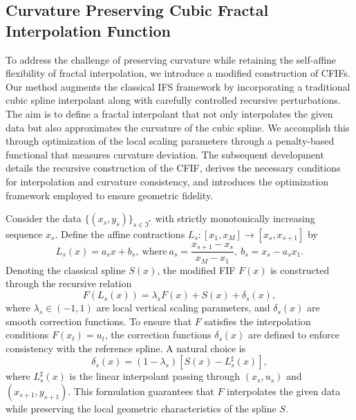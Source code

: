 \documentclass[runningheads]{llncs}
\begin{document}
	\subsection{Curvature Preserving Cubic Fractal Interpolation Function}
	To address the challenge of preserving curvature while retaining the self-affine flexibility of fractal interpolation, we introduce a modified construction of CFIFs. Our method augments the classical IFS framework by incorporating a traditional cubic spline interpolant along with carefully controlled recursive perturbations. The aim is to define a fractal interpolant that not only interpolates the given data but also approximates the curvature of the cubic spline. We accomplish this through optimization of the local scaling parameters through a penalty-based functional that measures curvature deviation. The subsequent development details the recursive construction of the CFIF, derives the necessary conditions for interpolation and curvature consistency, and introduces the optimization framework employed to ensure geometric fidelity.
	
	Consider the data $\{(x_s, y_s)\}_{s \in \Im^*} $ with strictly monotonically increasing sequence $x_s$. Define the affine contractions $ L_s : [x_1, x_M] \to [x_s, x_{s+1}] $ by $$ L_s(x) = a_s x + b_s, \ \text{where} \ a_s = \frac{x_{s+1} - x_s}{x_M - x_1}, \ b_s = x_s - a_s x_1.$$ Denoting the classical spline $ S(x) $, the modified FIF $ F(x) $ is constructed through the recursive relation
	\begin{equation}\label{NewF}
		F(L_s(x)) = \lambda_s F(x) + S(x) + \delta_s(x),
	\end{equation}
	where $ \lambda_s \in (-1,1) $ are local vertical scaling parameters, and $ \delta_s(x) $ are smooth correction functions. To ensure that $ F $ satisfies the interpolation conditions $ F(x_t) = u_t $, the correction functions $ \delta_s(x) $ are defined to enforce consistency with the reference spline. A natural choice is $$ \delta_s(x) = (1 - \lambda_s) \left[ S(x) - L_s^\sharp(x) \right],$$ where $ L_s^\sharp(x) $ is the linear interpolant passing through $ (x_s, u_s) $ and $ (x_{s+1}, y_{s+1}) $. This formulation guarantees that $ F $ interpolates the given data while preserving the local geometric characteristics of the spline $ S $.
	
	
\end{document}
